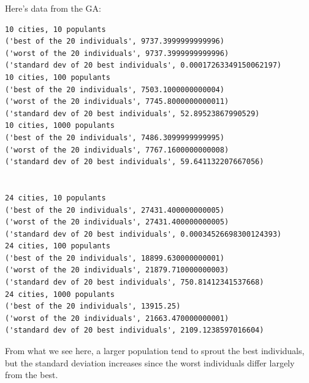 \documentclass[10pt, a4paper]{article}
\begin{document}
Here's data from the GA:
\begin{lstlisting}
10 cities, 10 populants
('best of the 20 individuals', 9737.3999999999996)
('worst of the 20 individuals', 9737.3999999999996)
('standard dev of 20 best individuals', 0.00017263349150062197)
10 cities, 100 populants
('best of the 20 individuals', 7503.1000000000004)
('worst of the 20 individuals', 7745.8000000000011)
('standard dev of 20 best individuals', 52.89523867990529)
10 cities, 1000 populants
('best of the 20 individuals', 7486.3099999999995)
('worst of the 20 individuals', 7767.1600000000008)
('standard dev of 20 best individuals', 59.641132207667056)
  
 
24 cities, 10 populants
('best of the 20 individuals', 27431.400000000005)
('worst of the 20 individuals', 27431.400000000005)
('standard dev of 20 best individuals', 0.00034526698300124393)
24 cities, 100 populants
('best of the 20 individuals', 18899.630000000001)
('worst of the 20 individuals', 21879.710000000003)
('standard dev of 20 best individuals', 750.81412341537668)
24 cities, 1000 populants
('best of the 20 individuals', 13915.25)
('worst of the 20 individuals', 21663.470000000001)
('standard dev of 20 best individuals', 2109.1238597016604)
\end{lstlisting}
From what we see here, a larger population tend to sprout the best individuals, but the standard deviation increases
since the worst individuals differ largely from the best.
\end{document}
